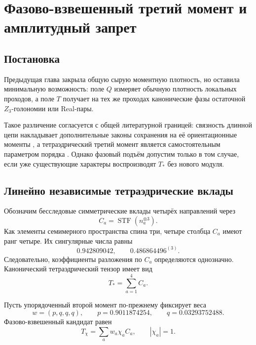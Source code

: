 \chapter{Фазово-взвешенный третий момент и амплитудный запрет}
\label{ch:v6-single-thread-phase-weighted-moment-lift-gate}

\section{Постановка}

Предыдущая глава закрыла общую сырую моментную плотность, но оставила
минимальную возможность: поле $Q$ измеряет обычную плотность локальных
проходов, а поле $T$ получает на тех же проходах канонические фазы
остаточной $Z_3$-голономии или Real-пары.

Такое различение согласуется с общей литературной границей: связность
длинной цепи накладывает дополнительные законы сохранения на её
ориентационные моменты
\cite{single-thread-moment-svensek2013,single-thread-moment-svensek2016},
а тетраэдрический третий момент является самостоятельным параметром
порядка
\cite{single-thread-moment-radzihovsky2000,single-thread-moment-lubensky2002}.
Однако фазовый подъём допустим только в том случае, если уже существующие
характеры воспроизводят $T_*$ без нового модуля.

\section{Линейно независимые тетраэдрические вклады}

Обозначим бесследовые симметрические вклады четырёх направлений через
\begin{equation}
 C_a=\operatorname{STF}(n_a^{\otimes3}).
\end{equation}
Как элементы семимерного пространства спина три, четыре столбца $C_a$
имеют ранг четыре. Их сингулярные числа равны
\begin{equation}
 0.942809042,
 \qquad
 0.486864496^{(3)}.
\end{equation}
Следовательно, коэффициенты разложения по $C_a$ определяются однозначно.
Канонический тетраэдрический тензор имеет вид
\begin{equation}
 T_*=\sum_{a=1}^{4}C_a.
\end{equation}

Пусть упорядоченный второй момент по-прежнему фиксирует веса
\begin{equation}
 w=(p,q,q,q),
 \qquad
 p=0.9011874254,
 \qquad
 q=0.03293752488.
\end{equation}
Фазово-взвешенный кандидат равен
\begin{equation}
 T_\chi=\sum_aw_a\chi_aC_a,
 \qquad |\chi_a|=1.
\end{equation}

